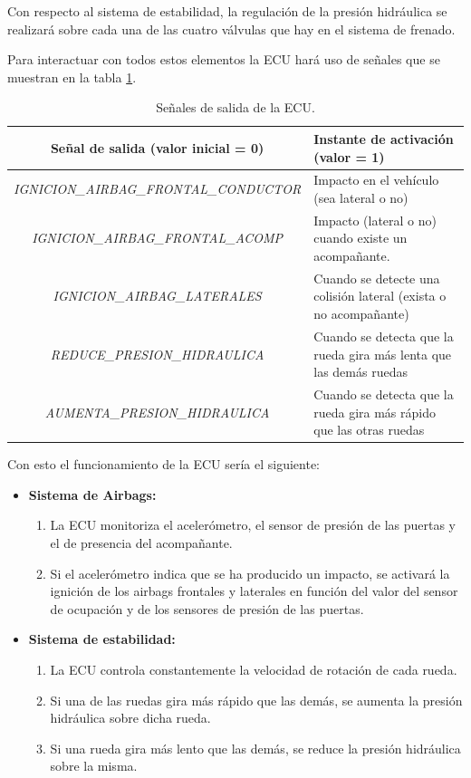 \documentclass{article}
\begin{document}
Con respecto al sistema de estabilidad, la regulación de la presión hidráulica se realizará sobre cada una de las cuatro válvulas que hay en el sistema de frenado.

Para interactuar con todos estos elementos la ECU hará uso de señales que se muestran en la tabla
\ref{tab:p4:salida_ECU}.

\begin{table}[H]
    \centering
    \begin{tabularx}{\textwidth}{| c | X |}
        \hline
\textbf{Señal de salida (valor inicial = 0)} & \textbf{Instante de activación (valor = 1)}     \\ \hline
\emph{IGNICION\_AIRBAG\_FRONTAL\_CONDUCTOR} & Impacto en el vehículo (sea lateral o no) \\ \hline
\emph{IGNICION\_AIRBAG\_FRONTAL\_ACOMP} & Impacto (lateral o no) cuando existe un acompañante.\\ \hline
\emph{IGNICION\_AIRBAG\_LATERALES} & Cuando se detecte una colisión lateral (exista o no acompañante) \\ \hline
\emph{REDUCE\_PRESION\_HIDRAULICA} & Cuando se detecta que la rueda gira más lenta que las demás ruedas\\ \hline
\emph{AUMENTA\_PRESION\_HIDRAULICA} & Cuando se detecta que la rueda gira más rápido que las otras ruedas  \\ \hline
    \end{tabularx}
	\caption{Señales de salida de la ECU.}
	\label{tab:p4:salida_ECU}
\end{table}

Con esto el funcionamiento de la ECU sería el siguiente:
\begin{itemize}
	\item \textbf{Sistema de Airbags:}
	\begin{enumerate}
		\item La ECU monitoriza el acelerómetro, el sensor de presión de las puertas y el de presencia del acompañante.
		\item Si el acelerómetro indica que se ha producido un impacto, se activará la ignición de los airbags frontales y laterales en función del valor del sensor de ocupación y de los sensores de presión de las puertas.
	\end{enumerate}
	
	\item \textbf{Sistema de estabilidad:}
	\begin{enumerate}
		\item La ECU controla constantemente la velocidad de rotación de cada rueda.
		\item Si una de las ruedas gira más rápido que las demás, se aumenta la presión hidráulica sobre dicha rueda.
		\item Si una rueda gira más lento que las demás, se reduce la presión hidráulica sobre la misma.
	\end{enumerate}
\end{itemize}
\end{document}
